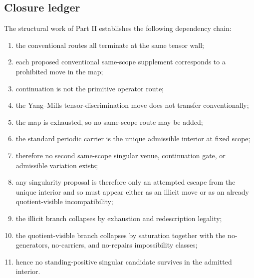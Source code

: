 \subsection{Closure ledger}
The structural work of Part II establishes the following dependency chain:
\begin{enumerate}[label=(\arabic*), leftmargin=2.2em]
\item the conventional routes all terminate at the same tensor wall;
\item each proposed conventional same-scope supplement corresponds to a prohibited move in the map;
\item continuation is not the primitive operator route;
\item the Yang--Mills tensor-discrimination move does not transfer conventionally;
\item the map is exhausted, so no same-scope route may be added;
\item the standard periodic carrier is the unique admissible interior at fixed scope;
\item therefore no second same-scope singular venue, continuation gate, or admissible variation exists;
\item any singularity proposal is therefore only an attempted escape from the unique interior and so must appear either as an illicit move or as an already quotient-visible incompatibility;
\item the illicit branch collapses by exhaustion and redescription legality;
\item the quotient-visible branch collapses by saturation together with the no-generators,
no-carriers, and no-repairs impossibility classes;
\item hence no standing-positive singular candidate survives in the admitted interior.
\end{enumerate}

\newpage
